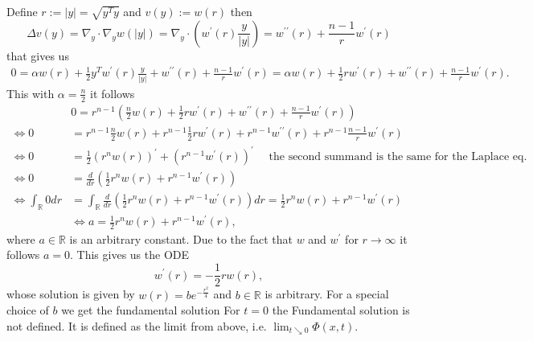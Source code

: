 \documentclass[A4,12pt,twoside]{book}
\begin{document}
Define $r:= |y| = \sqrt{y^T y}$ and $v(y) := w(r)$ then 
\[
\Delta v(y) = \nabla_y \cdot \nabla_y w (|y|) = \nabla_y \cdot \left( w^\prime (r) \frac{y}{|y|}\right) = w^{\prime \prime }(r) + \frac{n-1}{r} w^\prime (r) 
\]
that gives us 
\begin{align*}
0=\alpha w(r)+ \frac{1}{2} y^T w^\prime (r) \frac{y}{|y|} + w^{\prime \prime} (r) + \frac{n-1}{r} w^\prime (r) = \alpha w(r)+ \frac{1}{2} r w^\prime (r) + w^{\prime \prime} (r) + \frac{n-1}{r} w^\prime (r) .
\end{align*}
This with $\alpha = \frac{n}{2}$ it follows  
\begin{align*}
    &0= r^{n-1} \left( \frac{n}{2} w(r)+ \frac{1}{2} r w^\prime (r) + w^{\prime \prime} (r) + \frac{n-1}{r} w^\prime (r) \right)\\
    \iff 0&=   r^{n-1} \frac{n}{2} w(r)+  r^{n-1}\frac{1}{2} r w^\prime (r) +  r^{n-1} w^{\prime \prime} (r) +  r^{n-1}\frac{n-1}{r} w^\prime (r) \\
    \iff 0&= \frac{1}{2} \left( r^n w (r) \right)^\prime + (r^{n-1} w^\prime (r))^\prime \quad \text{ the second summand is the same for the Laplace eq.} \\
    \iff 0&= \frac{d}{dr} \left( \frac{1}{2} r^n w (r)  + r^{n-1} w^\prime (r) \right) \\
    \iff \int_{\mathbb{R}} 0 dr&= \int_\mathbb{R} \frac{d}{dr} \left( \frac{1}{2} r^n w (r)  + r^{n-1} w^\prime (r) \right) dr = \frac{1}{2} r^n w (r)  + r^{n-1} w^\prime (r)\\
    &\iff a = \frac{1}{2} r^n w (r)  + r^{n-1} w^\prime (r),
\end{align*}
where $a \in \mathbb{R}$ is an arbitrary constant. Due to the fact that $w$ and $w^\prime$ for $r \to \infty$ it follows $a=0$. This gives us the ODE 
\[
 w^\prime (r) = -\frac{1}{2} r w (r) ,
\]
whose solution is given by $w (r) = b e^{- \frac{r^2}{4}}$ and $b \in \mathbb{R}$ is arbitrary. For a special choice of $b$ we get the fundamental solution 
For $t=0$ the Fundamental solution is not defined. It is defined as the limit from above, i.e. $\lim_{t \searrow 0 } \Phi (x,t)$.
\end{document}
